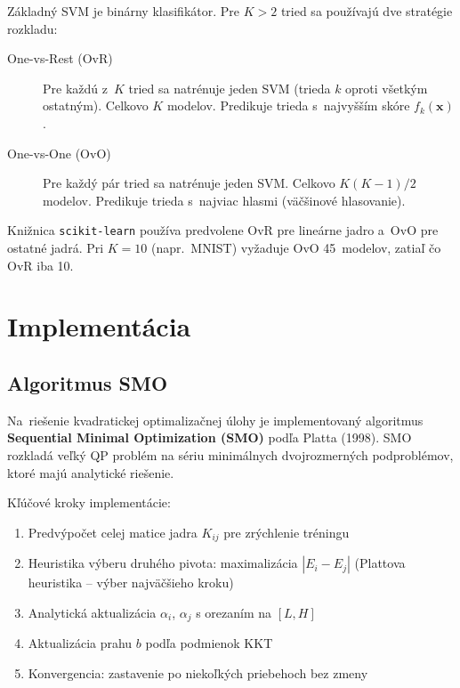 \documentclass[12pt,a4paper]{article}
\begin{document}
Základný SVM je binárny klasifikátor. Pre $K > 2$ tried sa používajú dve
stratégie rozkladu:

\begin{description}
  \item[One-vs-Rest (OvR)] Pre každú z~$K$ tried sa natrénuje jeden SVM
    (trieda $k$ oproti všetkým ostatným). Celkovo $K$ modelov. Predikuje
    trieda s~najvyšším skóre $f_k(\mathbf{x})$.
  \item[One-vs-One (OvO)] Pre každý pár tried sa natrénuje jeden SVM.
    Celkovo $K(K-1)/2$ modelov. Predikuje trieda s~najviac hlasmi
    (väčšinové hlasovanie).
\end{description}

Knižnica \texttt{scikit-learn} používa predvolene OvR pre lineárne jadro
a~OvO pre ostatné jadrá. Pri $K = 10$ (napr.\ MNIST) vyžaduje OvO
45~modelov, zatiaľ čo OvR iba 10.

\section{Implementácia}

\subsection{Algoritmus SMO}

Na~riešenie kvadratickej optimalizačnej úlohy je implementovaný algoritmus
\textbf{Sequential Minimal Optimization (SMO)} podľa Platta (1998).
SMO rozkladá veľký QP problém na sériu minimálnych dvojrozmerných
podproblémov, ktoré majú analytické riešenie.

Kľúčové kroky implementácie:
\begin{enumerate}
  \item Predvýpočet celej matice jadra $K_{ij}$ pre zrýchlenie tréningu
  \item Heuristika výberu druhého pivota: maximalizácia $|E_i - E_j|$
        (Plattova heuristika -- výber najväčšieho kroku)
  \item Analytická aktualizácia $\alpha_i$, $\alpha_j$ s orezaním
        na $[L, H]$
  \item Aktualizácia prahu $b$ podľa podmienok KKT
  \item Konvergencia: zastavenie po niekoľkých priebehoch bez zmeny
\end{enumerate}
\end{document}
